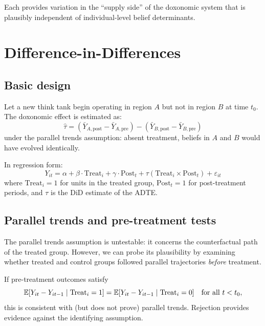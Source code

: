 Each provides variation in the ``supply side'' of the doxonomic system that is plausibly independent of individual-level belief determinants.

\section{Difference-in-Differences}
\label{sec:ch16-did}

\subsection{Basic design}

\begin{model}
\label{mod:did}
Let a new think tank begin operating in region $A$ but not in region $B$ at time $t_0$.
The doxonomic effect is estimated as:
\[
  \hat{\tau} = (\bar{Y}_{A,\text{post}} - \bar{Y}_{A,\text{pre}}) - (\bar{Y}_{B,\text{post}} - \bar{Y}_{B,\text{pre}})
\]
under the parallel trends assumption: absent treatment, beliefs in $A$ and $B$ would have evolved identically.
\end{model}

In regression form:
\[
  Y_{it} = \alpha + \beta \cdot \text{Treat}_i + \gamma \cdot \text{Post}_t + \tau(\text{Treat}_i \times \text{Post}_t) + \varepsilon_{it}
\]
where $\text{Treat}_i = 1$ for units in the treated group, $\text{Post}_t = 1$ for post-treatment periods, and $\tau$ is the DiD estimate of the ADTE.

\subsection{Parallel trends and pre-treatment tests}

The parallel trends assumption is untestable: it concerns the counterfactual path of the treated group.
However, we can probe its plausibility by examining whether treated and control groups followed parallel trajectories \emph{before} treatment.

\begin{proposition}
\label{prop:pre-trend}
If pre-treatment outcomes satisfy
\[
  \mathbb{E}[Y_{it} - Y_{it-1} \mid \text{Treat}_i = 1] = \mathbb{E}[Y_{it} - Y_{it-1} \mid \text{Treat}_i = 0] \quad \text{for all } t < t_0,
\]
this is consistent with (but does not prove) parallel trends.
Rejection provides evidence against the identifying assumption.
\end{proposition}

